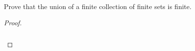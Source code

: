 Prove that the union of a finite collection of finite sets is finite. 

    \begin{proof}\renewcommand{\qedsymbol}{}\ \\\\
        \begin{align*}
        \end{align*}
    \end{proof}
